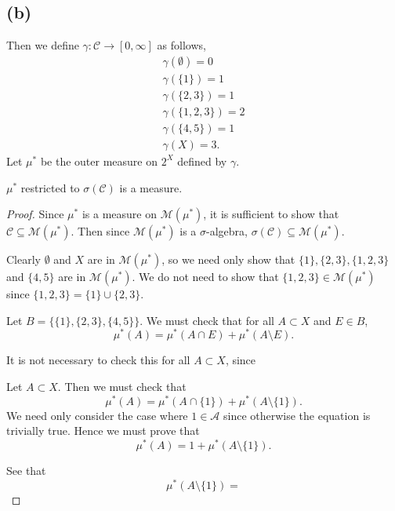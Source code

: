 \documentclass{unswmaths}
\begin{document}
\subsection*{(b)}
Then we define $\gamma:\mathcal{C}\rightarrow[0,\infty]$ as follows,
\begin{align*}
    \gamma(\emptyset) = 0\\
    \gamma(\{1\}) = 1\\
    \gamma(\{2,3\}) = 1\\
    \gamma(\{1,2,3\}) = 2\\
    \gamma(\{4,5\}) = 1\\
    \gamma(X) = 3.
\end{align*}
Let $\mu^*$ be the outer measure on $2^X$ defined by $\gamma$.
\begin{lemma}
    $\mu^*$ restricted to $\sigma(\mathcal{C})$ is a measure.
\end{lemma}
\begin{proof}
    Since $\mu^*$ is a measure on $\mathcal{M}(\mu^*)$, it is sufficient to show
    that $\mathcal{C} \subseteq \mathcal{M}(\mu^*)$. Then since $\mathcal{M}(\mu^*)$ is
    a $\sigma$-algebra, $\sigma(\mathcal{C}) \subseteq \mathcal{M}(\mu^*)$.
    
    Clearly $\emptyset$ and $X$ are in $\mathcal{M}(\mu^*)$, so 
    we need only show that $\{1\},\{2,3\},\{1,2,3\}$ and $\{4,5\}$
    are in $\mathcal{M}(\mu^*)$. We do not need to show that $\{1,2,3\} \in \mathcal{M}(\mu^*)$
    since $\{1,2,3\} = \{1\}\cup\{2,3\}$.
    
    Let $B = \{\{1\},\{2,3\},\{4,5\}\}$. We must check that for all $A \subset X$ and $E \in B$,
    \begin{equation*}
        \mu^*(A) = \mu^*(A\cap E) + \mu^*(A\setminus E).
    \end{equation*}
    
    It is not necessary to check this for all $A \subset X$, since 
    
    Let $A \subset X$. Then we must check that
    \begin{equation*}
        \mu^*(A) = \mu^*(A\cap \{1\}) + \mu^*(A\setminus\{1\}).
    \end{equation*}
    We need only consider the case where $1 \in \mathcal{A}$ since otherwise the equation is trivially true.
    Hence we must prove that
    \begin{equation*}
        \mu^*(A) = 1 + \mu^*(A\setminus\{1\}).
    \end{equation*}
    
    See that
    \begin{equation*}
        \mu^*(A\setminus\{1\}) = 
    \end{equation*}

    
\end{proof} 
\end{document}
